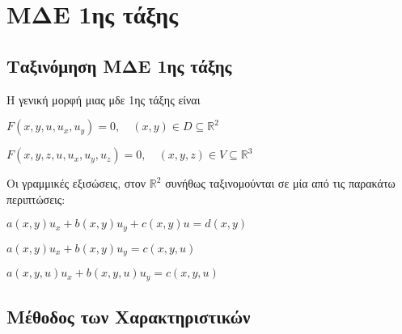 \documentclass[a4paper,table]{report}
\begin{document}
\chapter*{ΜΔΕ 1ης τάξης}

\section*{Ταξινόμηση ΜΔΕ 1ης τάξης}

Η γενική μορφή μιας μδε 1ης τάξης είναι 
\begin{description}
  [labelindent=1em]
  \item [στον $\mathbb{R}^{2}$:] $ F(x,y,u,u_{x},u_{y}) = 0, \quad (x,y) \in D 
    \subseteq \mathbb{R}^{2} $  
  \item [στον $\mathbb{R}^{3}$:] $ F(x,y,z,u,u_{x},u_{y},u_{z}) = 0, \quad (x,y,z) \in V 
    \subseteq \mathbb{R}^{3} $ 
\end{description} 

Οι γραμμικές εξισώσεις, στον $ \mathbb{R}^{2} $ συνήθως ταξινομούνται σε μία από τις 
παρακάτω περιπτώσεις:
\begin{description}
  [widest=Σχεδον Γραμμικες:,labelindent=1em,labelsep*=1em, itemindent=0pt,leftmargin=*]
  \item [Γραμμικές:] $ a(x,y)u_{x}+b(x,y)u_{y}+c(x,y)u=d(x,y) $
  \item [Σχεδόν Γραμμικές:] $ a(x,y)u_{x}+b(x,y)u_{y}=c(x,y,u) $
  \item [Ημιγραμμικές:] $ a(x,y,u)u_{x}+b(x,y,u)u_{y}=c(x,y,u) $
\end{description}

\section*{Μέθοδος των Χαρακτηριστικών}
\end{document}
